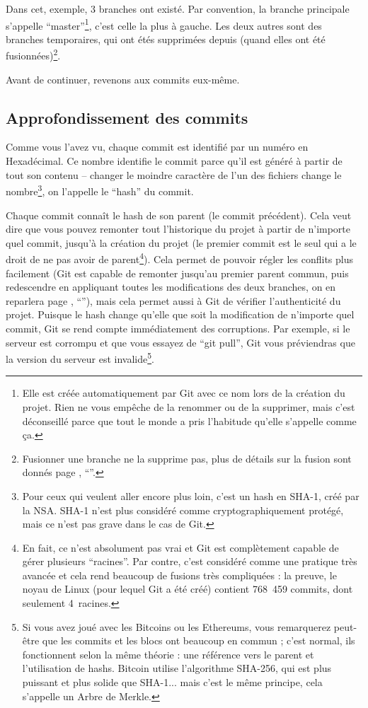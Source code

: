 \documentclass[10pt,a4paper]{article}
\begin{document}
Dans cet, exemple, 3 branches ont existé. Par convention, la branche principale s'appelle ``master''\footnote{Elle est créée automatiquement par Git avec ce nom lors de la création du projet. Rien ne vous empêche de la renommer ou de la supprimer, mais c'est déconseillé parce que tout le monde a pris l'habitude qu'elle s'appelle comme ça.}, c'est celle la plus à gauche. Les deux autres sont des branches temporaires, qui ont étés supprimées depuis (quand elles ont été fusionnées)\footnote{Fusionner une branche ne la supprime pas, plus de détails sur la fusion sont donnés page \pageref{end-branch}, ``''.}.

Avant de continuer, revenons aux commits eux-même.

\subsection{Approfondissement des commits}

Comme vous l'avez vu, chaque commit est identifié par un numéro en Hexadécimal. Ce nombre identifie le commit parce qu'il est généré à partir de tout son contenu -- changer le moindre caractère de l'un des fichiers change le nombre\footnote{Pour ceux qui veulent aller encore plus loin, c'est un hash en SHA-1, créé par la NSA. SHA-1 n'est plus considéré comme cryptographiquement protégé, mais ce n'est pas grave dans le cas de Git.}, on l'appelle le ``hash'' du commit.

Chaque commit connaît le hash de son parent (le commit précédent). Cela veut dire que vous pouvez remonter tout l'historique du projet à partir de n'importe quel commit, jusqu'à la création du projet (le premier commit est le seul qui a le droit de ne pas avoir de parent\footnote{En fait, ce n'est absolument pas vrai et Git est complètement capable de gérer plusieurs ``racines''. Par contre, c'est considéré comme une pratique très avancée et cela rend beaucoup de fusions très compliquées : la preuve, le noyau de Linux (pour lequel Git a été créé) contient 768~459 commits, dont seulement 4~racines.}). Cela permet de pouvoir régler les conflits plus facilement (Git est capable de remonter jusqu'au premier parent commun, puis redescendre en appliquant toutes les modifications des deux branches, on en reparlera page \pageref{end-branch}, ``''), mais cela permet aussi à Git de vérifier l'authenticité du projet. Puisque le hash change qu'elle que soit la modification de n'importe quel commit, Git se rend compte immédiatement des corruptions. Par exemple, si le serveur est corrompu et que vous essayez de ``git pull'', Git vous préviendras que la version du serveur est invalide\footnote{Si vous avez joué avec les Bitcoins ou les Ethereums, vous remarquerez peut-être que les commits et les blocs ont beaucoup en commun ; c'est normal, ils fonctionnent selon la même théorie : une référence vers le parent et l'utilisation de hashs. Bitcoin utilise l'algorithme SHA-256, qui est plus puissant et plus solide que SHA-1... mais c'est le même principe, cela s'appelle un Arbre de Merkle.}.
\end{document}
